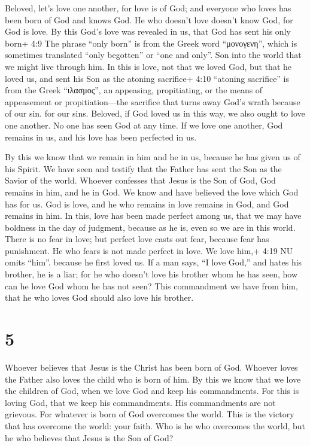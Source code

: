  Beloved, let's love one another, for love is of God; and
everyone who loves has been born of God and knows God.  He
who doesn't love doesn't know God, for God is love.  By this
God's love was revealed in us, that God has sent his only born+ 4:9 The
phrase ``only born'' is from the Greek word ``μονογενη'', which is
sometimes translated ``only begotten'' or ``one and only''. Son into the
world that we might live through him.  In this is love, not
that we loved God, but that he loved us, and sent his Son as the atoning
sacrifice+ 4:10 ``atoning sacrifice'' is from the Greek ``ιλασμος'', an
appeasing, propitiating, or the means of appeasement or
propitiation---the sacrifice that turns away God's wrath because of our
sin. for our sins.  Beloved, if God loved us in this way,
we also ought to love one another.  No one has seen God at
any time. If we love one another, God remains in us, and his love has
been perfected in us.

 By this we know that we remain in him and he in us,
because he has given us of his Spirit.  We have seen and
testify that the Father has sent the Son as the Savior of the world.
 Whoever confesses that Jesus is the Son of God, God
remains in him, and he in God.  We know and have believed
the love which God has for us. God is love, and he who remains in love
remains in God, and God remains in him.  In this, love has
been made perfect among us, that we may have boldness in the day of
judgment, because as he is, even so we are in this world. 
There is no fear in love; but perfect love casts out fear, because fear
has punishment. He who fears is not made perfect in love. 
We love him,+ 4:19 NU omits ``him''. because he first loved us.
 If a man says, ``I love God,'' and hates his brother, he
is a liar; for he who doesn't love his brother whom he has seen, how can
he love God whom he has not seen?  This commandment we have
from him, that he who loves God should also love his brother.

\hypertarget{section-4}{%
\section{5}\label{section-4}}

 Whoever believes that Jesus is the Christ has been born of
God. Whoever loves the Father also loves the child who is born of him.
 By this we know that we love the children of God, when we
love God and keep his commandments.  For this is loving God,
that we keep his commandments. His commandments are not grievous.
 For whatever is born of God overcomes the world. This is
the victory that has overcome the world: your faith.  Who is
he who overcomes the world, but he who believes that Jesus is the Son of
God?

